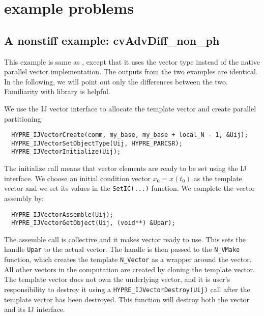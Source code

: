 \section{{\hypre} example problems}\label{s:ex_parhyp}

\subsection{A nonstiff example: cvAdvDiff\_non\_ph}\label{ss:cvAdvDiff_ph}

This example is same as , except that it
uses the {\hypre} vector type instead of the {\sundials} native
parallel vector implementation. 
The outputs from the two examples are identical. In the following, we will point 
out only the differences between the two. Familiarity with {\hypre} library 
\cite{hypre_um} is helpful.  

We use the {\hypre} IJ vector interface to allocate the template vector and 
create parallel partitioning: 
\begin{verbatim}
  HYPRE_IJVectorCreate(comm, my_base, my_base + local_N - 1, &Uij);
  HYPRE_IJVectorSetObjectType(Uij, HYPRE_PARCSR);
  HYPRE_IJVectorInitialize(Uij);
\end{verbatim}
The initialize call means that vector elements are ready to be set using 
the IJ interface. We choose an initial condition vector $x_0 = x(t_0)$ as the 
template vector and we set its values in the \verb|SetIC(...)| function. We 
complete the {\hypre} vector assembly by:
\begin{verbatim}
  HYPRE_IJVectorAssemble(Uij);
  HYPRE_IJVectorGetObject(Uij, (void**) &Upar);
\end{verbatim}
The assemble call is collective and it makes {\hypre} vector ready to use. 
This sets the handle \verb|Upar| to the actual {\hypre} vector. 
The handle is then passed to the \verb|N_VMake| function, which creates 
the template \verb|N_Vector| as a wrapper around the {\hypre} vector. 
All other vectors in the computation are created by cloning the template 
vector. The template vector does not own the underlying {\hypre} vector, 
and it is user's responsibility to destroy it using a
\verb|HYPRE_IJVectorDestroy(Uij)| call after the template vector has been 
destroyed. This function will destroy both the {\hypre} vector and its IJ 
interface.

